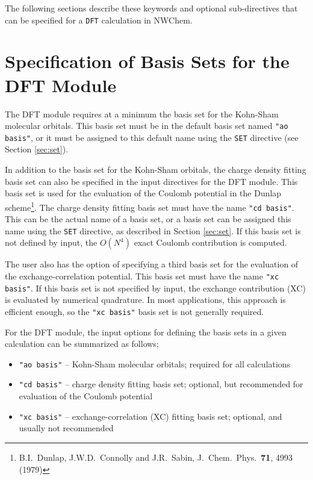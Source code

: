 
The following 
sections describe these keywords and
optional sub-directives that can be specified for a \verb+DFT+ calculation
in NWChem.

\section{Specification of Basis Sets for the DFT Module}

The DFT module requires at a minimum the basis set for the Kohn-Sham 
molecular orbitals.  This basis set must be in the default basis set named
{\tt "ao basis"}, or it must be assigned to this default name using the
\verb+SET+ directive (see Section \ref{sec:set}).

In addition to the basis set for the Kohn-Sham orbitals, 
the charge density fitting basis set can also be specified in the 
input directives for the DFT module.  This basis set is used for the 
evaluation of the Coulomb potential in the Dunlap scheme\footnote{B.I.~Dunlap, 
J.W.D.~Connolly and J.R.~Sabin, J.~Chem.~Phys.~{\bf 71},  4993 (1979)}.
The charge density fitting basis set must have the name {\tt "cd basis"}.
This can be the actual name of a basis set, or a basis set can be 
assigned this name using the \verb+SET+ directive, as described in
Section \ref{sec:set}.  If this basis set is not defined by input,
the $O(N^4)$ exact Coulomb contribution is computed.

The user also has the option of specifying a third basis set for the 
evaluation of the exchange-correlation potential.  This basis set must
have the name {\tt "xc basis"}.  If this basis set is not specified
by input, the exchange contribution (XC) is evaluated by numerical
quadrature.  In most applications, this approach is efficient enough,
so the {\tt "xc basis"} basis set is not generally required.

For the DFT module, the input options for defining the basis sets in a given
calculation can be summarized as follows;
\begin{itemize}
\item {\tt "ao basis"} -- Kohn-Sham molecular orbitals; required for all 
calculations
\item {\tt "cd basis"} -- charge density fitting basis set; optional, but
recommended for evaluation of the Coulomb potential
\item {\tt "xc basis"} -- exchange-correlation (XC) fitting basis set; 
optional, and usually not recommended
\end{itemize}


